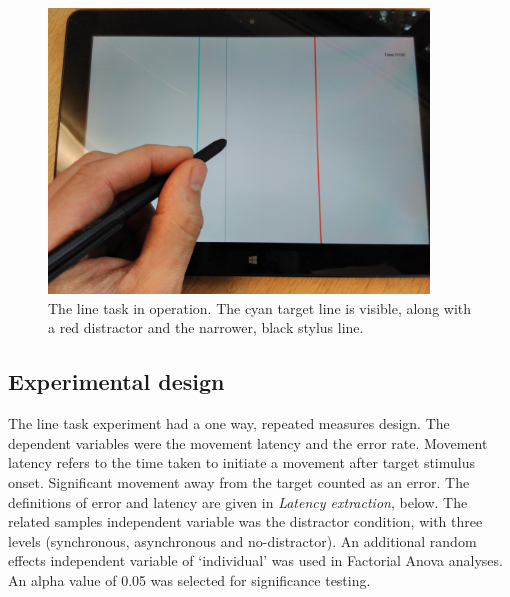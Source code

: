 \documentclass[10pt,letterpaper]{article}
\begin{document}
\begin{figure}[htb!]
\centering
\includegraphics[width=0.9\textwidth]{./figures/linetask.jpg}
\caption[The line task.]
{The line task in operation. The cyan
  target line is visible, along with a red distractor and the
  narrower, black stylus line.}
\label{linetask}
\end{figure}

\subsection*{Experimental design}
The line task experiment had a one way, repeated measures design. The
dependent variables were the movement latency and the error
rate. Movement latency refers to the time taken to initiate a movement
after target stimulus onset. Significant movement away from the target
counted as an error. The definitions of error and latency are given in
\emph{Latency extraction}, below. The related samples independent
variable was the distractor condition, with three levels (synchronous,
asynchronous and no-distractor). An additional random effects
independent variable of `individual' was used in Factorial Anova
analyses. An alpha value of 0.05 was selected for significance
testing. %
\end{document}
